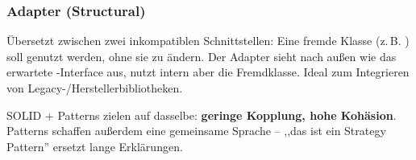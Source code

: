 \subsubsection*{Adapter (Structural)}
\"Ubersetzt zwischen zwei inkompatiblen Schnittstellen: Eine fremde Klasse (z.\,B. ) soll genutzt werden, ohne sie zu \"andern. Der Adapter sieht nach au\ss en wie das erwartete -Interface aus, nutzt intern aber die Fremdklasse. Ideal zum Integrieren von Legacy-/Herstellerbibliotheken.

\begin{tipp}
SOLID + Patterns zielen auf dasselbe: \textbf{geringe Kopplung, hohe Kohäsion}. Patterns schaffen au\ss erdem eine gemeinsame Sprache -- ,,das ist ein Strategy Pattern'' ersetzt lange Erkl\"arungen.
\end{tipp}
\clearpage
